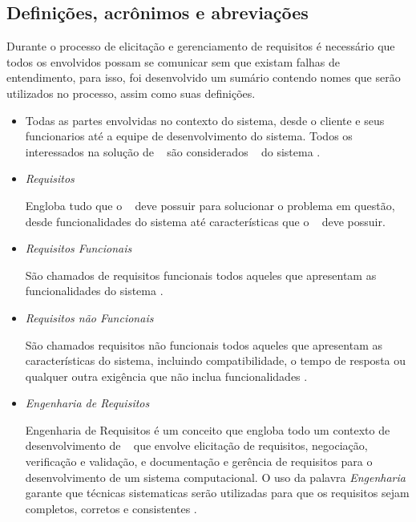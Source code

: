 \subsection{Definições, acrônimos e abreviações}

Durante o processo de elicitação e gerenciamento de requisitos é necessário que todos os envolvidos possam se comunicar sem que existam falhas de entendimento, para isso, foi desenvolvido um sumário contendo nomes que serão utilizados no processo, assim como suas definições.

\begin{itemize}

	\item \stakeholder

		Todas as partes envolvidas no contexto do sistema, desde o cliente e seus funcionarios até a equipe de desenvolvimento do sistema. Todos os interessados na solução de \sw~ são considerados \stakeholder~ do sistema \cite{sommerville2003engenharia}.

	\item \textit{Requisitos} 

		Engloba tudo que o \sw~ deve possuir para solucionar o problema em questão, desde funcionalidades do sistema até características que o \sw~ deve possuir.

	\item \textit{Requisitos Funcionais}

		São chamados de requisitos funcionais todos aqueles que apresentam as funcionalidades do sistema \cite{sommerville2003engenharia}.

	\item \textit{Requisitos não Funcionais}

		São chamados requisitos não funcionais todos aqueles que apresentam as características do sistema, incluindo compatibilidade, o tempo de resposta ou qualquer outra exigência que não inclua funcionalidades \cite{sommerville2003engenharia}.

	\item \textit{Engenharia de Requisitos}

		Engenharia de Requisitos é um conceito que engloba todo um contexto de desenvolvimento de \sw~ que envolve elicitação de requisitos, negociação, verificação e validação, e documentação e gerência de requisitos para o desenvolvimento de um sistema computacional. O uso da palavra \textit{Engenharia} garante que técnicas sistematicas serão utilizadas para que os requisitos sejam completos, corretos e consistentes \cite{de2004analise}. 


\end{itemize}
